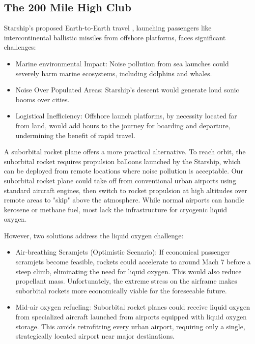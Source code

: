 \documentclass{article}
\begin{document}
\subsection{The 200 Mile High Club}
Starship's proposed Earth-to-Earth travel \cite{earth_to_earth}, launching passengers like intercontinental ballistic missiles from offshore platforms, faces significant challenges:
\begin{itemize}
\item Marine environmental Impact: Noise pollution from sea launches could severely harm marine ecosystems, including dolphins and whales.
\item Noise Over Populated Areas: Starship's descent would generate loud sonic booms over cities.
\item Logistical Inefficiency: Offshore launch platforms, by necessity located far from land, would add hours to the journey for boarding and departure, undermining the benefit of rapid travel.
\end{itemize}
A suborbital rocket plane offers a more practical alternative. To reach orbit, the suborbital rocket requires propulsion balloons launched by the Starship, which can be deployed from remote locations where noise pollution is acceptable.  Our suborbital rocket plane could take off from conventional urban airports using standard aircraft engines, then switch to rocket propulsion at high altitudes over remote areas to "skip" above the atmosphere. While normal airports can handle kerosene or methane fuel, most lack the infrastructure for cryogenic liquid oxygen.

However, two solutions address the liquid oxygen challenge:
\begin{itemize}
\item Air-breathing Scramjets (Optimistic Scenario): If economical passenger scramjets become feasible, rockets could accelerate to around Mach 7 before a steep climb, eliminating the need for liquid oxygen. This would also reduce propellant mass. Unfortunately, the extreme stress on the airframe makes suborbital rockets more economically viable for the foreseeable future.
\item Mid-air oxygen refueling: Suborbital rocket planes could receive liquid oxygen from specialized aircraft launched from airports equipped with liquid oxygen storage. This avoids retrofitting every urban airport, requiring only a single, strategically located airport near major destinations.
\end{itemize}
\end{document}

